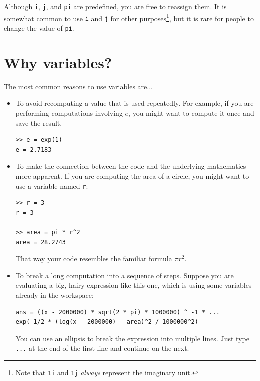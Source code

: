 \documentclass[
]{book}
\begin{document}
Although {\tt i}, {\tt j}, and {\tt pi} are predefined, you are free
to reassign them.  It is somewhat common to use {\tt i} and {\tt j} for other
purposes\footnote{Note that {\tt 1i} and {\tt 1j} \textit{always}
represent the imaginary unit.}, but it is rare for people  
to change the value of
{\tt pi}.

\section{Why variables?}

The most common reasons to use variables are...

\begin{itemize}

\item To avoid recomputing a value that is used repeatedly.  For
example, if you are performing computations involving $e$, you might
want to compute it once and save the result.

\begin{verbatim}
>> e = exp(1)
e = 2.7183
\end{verbatim}


\item To make the connection between the code and the underlying
mathematics more apparent.  If you are computing the area of a circle,
you might want to use a variable named {\tt r}:

\begin{verbatim}
>> r = 3
r = 3

>> area = pi * r^2
area = 28.2743
\end{verbatim}

That way your code resembles the familiar formula $\pi r^2$.

\item To break a long computation into a sequence of steps.
Suppose you are evaluating a big, hairy expression like this one, which is using some variables
already in the workspace:

\begin{verbatim}
ans = ((x - 2000000) * sqrt(2 * pi) * 1000000) ^ -1 * ...
exp(-1/2 * (log(x - 2000000) - area)^2 / 1000000^2)
\end{verbatim}

You can use an ellipsis to break the expression into multiple lines.
Just type {\tt ...} at the end of the first line and continue on the
next.


\end{itemize}
\end{document}
